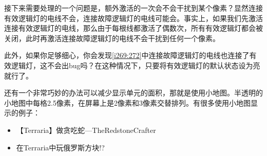 接下来需要处理的一个问题是，额外激活的一次会不会干扰到某个像素？显然连接有效逻辑灯的电线不会，连接故障逻辑灯的电线可能会。事实上，如果我们先激活连接有效逻辑灯的电线，那么由于每根线都激活了偶数次，所有有效逻辑灯都会被关闭，此时再激活连接故障逻辑灯的电线不会干扰到任何一个像素。

此外，如果你足够细心，你会发现\autoref{i269:272}中连接故障逻辑灯的电线也连接了有效逻辑灯，这不会出bug吗？在这种情况下，只要将有效逻辑灯的默认状态设为亮就行了。

还有一个非常巧妙的办法可以减少显示单元的面积，那就是使用小地图。半透明的小地图中每格2.5像素，在屏幕上是2像素和3像素交替排列。有很多使用小地图显示的例子：
\begin{itemize}
  \item 【Terraria】做贪吃蛇—TheRedstoneCrafter 
  \item 在Terraria中玩俄罗斯方块!? 
\end{itemize}


